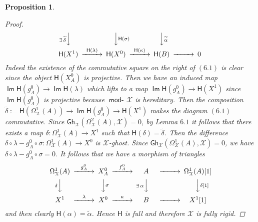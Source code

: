 \documentclass[oneside, a4paper,reqno]{amsart}
\numberwithin{equation}{section}
\newtheorem{prop}[thm]{Proposition}
\theoremstyle{definition}
\begin{document}
\begin{prop}
\begin{proof}
\begin{equation}
\begin{CD}
 @V{\exists \, \widetilde{\delta}}VV  @VV{\mathsf{H}(\sigma)}V   @VV{\widetilde{\alpha}}V & \ &    \\ 
 \mathsf{H}(X^{1})  @> \mathsf{H}(\lambda) >> \mathsf{H}(X^{0}) @> \mathsf{H}(\kappa) >> \mathsf{H}(B) @>  >> 0 
\end{CD}
\end{equation}  
Indeed the existence of the commutative square on the right of $(6.1)$ is clear since the object $\mathsf{H}(X^{0}_{A})$ is projective. Then we have an induced map $\operatorname*{\mathsf{Im}}\mathsf{H}(g^{0}_{A}) {\longrightarrow} \operatorname*{\mathsf{Im}}\mathsf{H}(\lambda)$ which lifts to a map  $\operatorname*{\mathsf{Im}}\mathsf{H}(g^{0}_{A}) {\longrightarrow} \mathsf{H}(X^{1})$ since $\operatorname*{\mathsf{Im}}\mathsf{H}(g^{0}_{A})$ is projective because $\operatorname*{\mathsf{mod}-\!}{\mathcal X}$ is hereditary. Then the composition  $\widetilde{\delta} := \mathsf{H}(\Omega^{1}_{\mathcal X}(A)) {\longrightarrow}\operatorname*{\mathsf{Im}}\mathsf{H}(g^{0}_{A}) {\longrightarrow} \mathsf{H}(X^{1})$ makes the diagram $(6.1)$ commutative. Since $\mathsf{Gh}_{\mathcal X}(\Omega^{2}_{\mathcal X}(A),{\mathcal X}) = 0$, by Lemma $6.1$ it follows that there exists a map $\delta \colon \Omega^{1}_{\mathcal X}(A) {\longrightarrow} X^{1}$ such that $\mathsf{H}(\delta) = \widetilde{\delta}$. Then the difference $\delta\circ \lambda - g^{0}_{A} \circ \sigma \colon \Omega^{1}_{\mathcal X}(A) {\longrightarrow} X^{0}$ is ${\mathcal X}$-ghost. Since $\mathsf{Gh}_{\mathcal X}(\Omega^{1}_{\mathcal X}(A),{\mathcal X}) = 0$, we have $\delta\circ \lambda - g^{0}_{A} \circ \sigma = 0$. It follows that we have a morphism of triangles 
\[
\begin{CD}
\Omega^{1}_{\mathcal X}(A) @> g^{0}_{A} >> X^{0}_{A} @> f^{0}_{A} >> A @>  >> \Omega^{1}_{\mathcal X}(A)[1] \\
 @V{\delta}VV  @VV{\sigma}V   @V{\exists \, \alpha}VV @VV{\delta[1]}V    \\ 
 X^{1}  @> \lambda >> X^{0} @> \kappa >> \ \ \  B \ \ \ @>  >> X^{1}[1]
\end{CD}
\]
and then clearly $\mathsf{H}(\alpha) = \widetilde{\alpha}$. Hence $\mathsf{H}$ is full and therefore ${\mathcal X}$ is fully rigid. 
\end{proof}
\end{prop}
\end{document}
